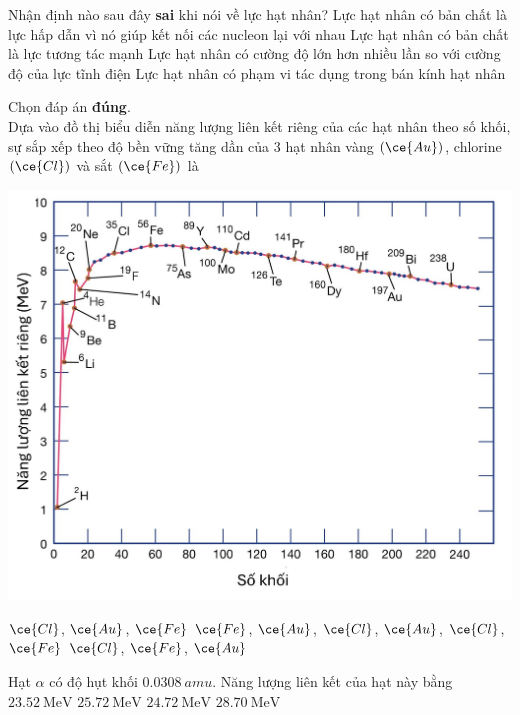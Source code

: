\begin{ex}
	Nhận định nào sau đây \textbf{sai} khi nói về lực hạt nhân?
	\choice
	{\True Lực hạt nhân có bản chất là lực hấp dẫn vì nó giúp kết nối các nucleon lại với nhau}
	{Lực hạt nhân có bản chất là lực tương tác mạnh}
	{Lực hạt nhân có cường độ lớn hơn nhiều lần so với cường độ của lực tĩnh điện}
	{Lực hạt nhân có phạm vi tác dụng trong bán kính hạt nhân}
	\loigiai{}
\end{ex}
\begin{ex}
	Chọn đáp án \textbf{đúng}.\\
	Dựa vào đồ thị biểu diễn năng lượng liên kết riêng của các hạt nhân theo số khối, sự sắp xếp theo độ bền vững tăng dần của 3 hạt nhân vàng $\left(\ce{Au}\right)$, chlorine $\left(\ce{Cl}\right)$ và sắt $\left(\ce{Fe}\right)$ là
	\begin{center}
		\includegraphics[width=0.7\linewidth]{figs/VN12-Y24-PH-SYL-027P-3}
	\end{center}
	\choice
	{$\ce{Cl}$, $\ce{Au}$, $\ce{Fe}$}
	{$\ce{Fe}$, $\ce{Au}$, $\ce{Cl}$, }
	{\True $\ce{Au}$, $\ce{Cl}$, $\ce{Fe}$}
	{$\ce{Cl}$, $\ce{Fe}$, $\ce{Au}$}
	\loigiai{}
\end{ex}
\begin{ex}
	Hạt $\alpha$ có độ hụt khối $\SI{0.0308}{amu}$. Năng lượng liên kết của hạt này bằng	
	\choice
	{$\SI{23.52}{\mega\electronvolt}$}
	{$\SI{25.72}{\mega\electronvolt}$}
	{$\SI{24.72}{\mega\electronvolt}$}
	{\True $\SI{28.70}{\mega\electronvolt}$}
\end{ex}
